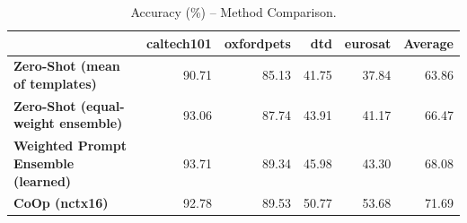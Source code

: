 \begin{table}
\caption{Accuracy (\%) -- Method Comparison.}
\label{tab:results}
\begin{tabular}{lrrrrr}
\toprule
 & caltech101 & oxfordpets & dtd & eurosat & Average \\
\midrule
\textbf{Zero-Shot (mean of templates)} & 90.71 & 85.13 & 41.75 & 37.84 & 63.86 \\
\textbf{Zero-Shot (equal-weight ensemble)} & 93.06 & 87.74 & 43.91 & 41.17 & 66.47 \\
\textbf{Weighted Prompt Ensemble (learned)} & 93.71 & 89.34 & 45.98 & 43.30 & 68.08 \\
\textbf{CoOp (nctx16)} & 92.78 & 89.53 & 50.77 & 53.68 & 71.69 \\
\bottomrule
\end{tabular}
\end{table}
